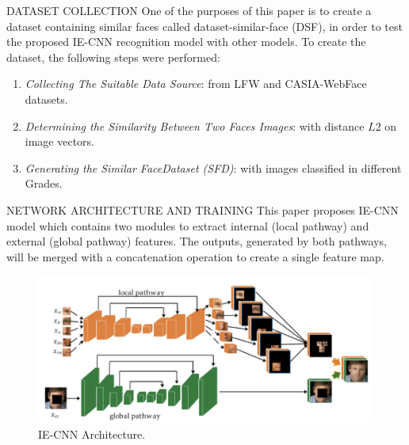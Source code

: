 \begin{frame}{DATASET COLLECTION}
    One of the purposes of this paper is to create a dataset containing similar faces called dataset-similar-face (DSF), in order to test the proposed IE-CNN recognition model with other models. To create the dataset, the following steps were performed:
    \begin{enumerate}
        \item \emph{Collecting The Suitable Data Source}: from LFW and CASIA-WebFace datasets.
        \item \emph{Determining the Similarity Between Two Faces Images}: with distance $L2$ on image vectors.
        \item \emph{Generating the Similar FaceDataset (SFD)}: with images classified in different Grades.
    \end{enumerate}
\end{frame}

\begin{frame}{NETWORK ARCHITECTURE AND TRAINING}
    This paper proposes IE-CNN model which contains two modules to 
    extract internal (local pathway) and external (global pathway) features. 
    The outputs, generated by both pathways, will be merged with a 
    concatenation operation to create a single feature map.
    \begin{figure}[h!]
        \centering
        \includegraphics[width = 0.8\linewidth]{images/paper9/IE-CNN.png}
        \centering
        \caption{IE-CNN Architecture.}
        \label{fig:IE-CNN ARCHITECTURE}
    \end{figure}
\end{frame}